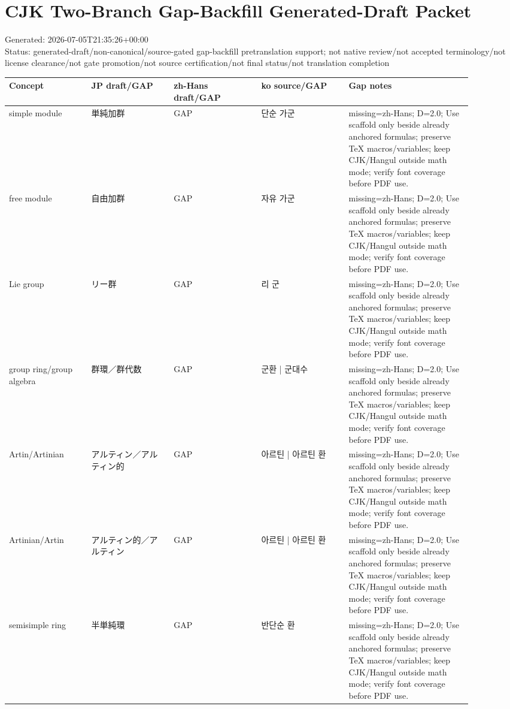 \documentclass{article}
\begin{document}
\section*{CJK Two-Branch Gap-Backfill Generated-Draft Packet}
Generated: 2026-07-05T21:35:26+00:00\\
Status: generated-draft/non-canonical/source-gated gap-backfill pretranslation support; not native review/not accepted terminology/not license clearance/not gate promotion/not source certification/not final status/not translation completion

\begin{longtable}{p{0.16\linewidth}p{0.16\linewidth}p{0.17\linewidth}p{0.17\linewidth}p{0.24\linewidth}}
\textbf{Concept} & \textbf{JP draft/GAP} & \textbf{zh-Hans draft/GAP} & \textbf{ko source/GAP} & \textbf{Gap notes}\\ \hline
simple module & 単純加群 & GAP & 단순 가군 & missing=zh-Hans; D=2.0; Use scaffold only beside already anchored formulas; preserve TeX macros/variables; keep CJK/Hangul outside math mode; verify font coverage before PDF use.\\
free module & 自由加群 & GAP & 자유 가군 & missing=zh-Hans; D=2.0; Use scaffold only beside already anchored formulas; preserve TeX macros/variables; keep CJK/Hangul outside math mode; verify font coverage before PDF use.\\
Lie group & リー群 & GAP & 리 군 & missing=zh-Hans; D=2.0; Use scaffold only beside already anchored formulas; preserve TeX macros/variables; keep CJK/Hangul outside math mode; verify font coverage before PDF use.\\
group ring/group algebra & 群環／群代数 & GAP & 군환 | 군대수 & missing=zh-Hans; D=2.0; Use scaffold only beside already anchored formulas; preserve TeX macros/variables; keep CJK/Hangul outside math mode; verify font coverage before PDF use.\\
Artin/Artinian & アルティン／アルティン的 & GAP & 아르틴 | 아르틴 환 & missing=zh-Hans; D=2.0; Use scaffold only beside already anchored formulas; preserve TeX macros/variables; keep CJK/Hangul outside math mode; verify font coverage before PDF use.\\
Artinian/Artin & アルティン的／アルティン & GAP & 아르틴 | 아르틴 환 & missing=zh-Hans; D=2.0; Use scaffold only beside already anchored formulas; preserve TeX macros/variables; keep CJK/Hangul outside math mode; verify font coverage before PDF use.\\
semisimple ring & 半単純環 & GAP & 반단순 환 & missing=zh-Hans; D=2.0; Use scaffold only beside already anchored formulas; preserve TeX macros/variables; keep CJK/Hangul outside math mode; verify font coverage before PDF use.\\

\end{longtable}
\end{document}
